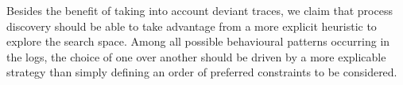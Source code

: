 Besides the benefit of taking into account deviant traces, we claim that process discovery should be able to take advantage from a more explicit heuristic to explore the search space. Among all possible behavioural patterns occurring in the logs, the choice of one over another should be driven by a more explicable strategy than simply defining an order of preferred constraints to be considered.
 




